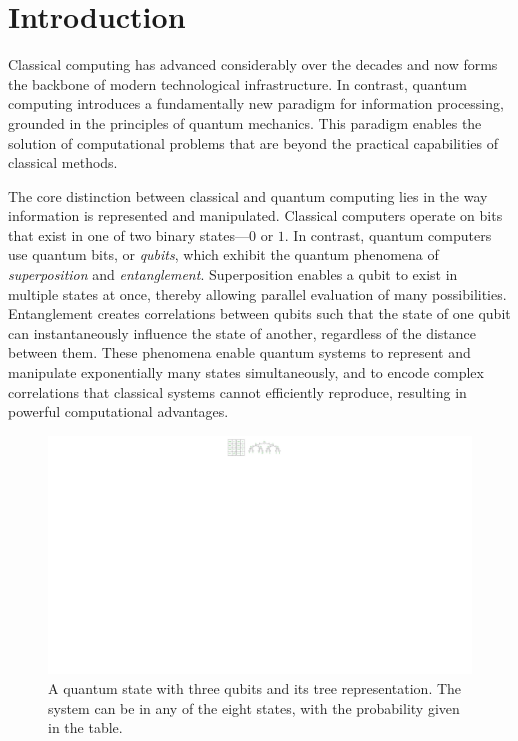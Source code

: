 \section{Introduction}
\label{introduction:section}

Classical computing has advanced considerably over the decades and now forms the backbone of modern technological infrastructure. %
In contrast, quantum computing introduces a fundamentally new paradigm for information processing, grounded in the principles of quantum mechanics. This paradigm enables the solution of computational problems that are beyond the practical capabilities of classical methods. %

The core distinction between classical and quantum computing lies in the way information is represented and manipulated. %
Classical computers operate on bits that exist in one of two binary states—$0$ or $1$. In contrast, quantum computers use quantum bits, or \emph{qubits}, which exhibit the quantum phenomena of \emph{superposition} and \emph{entanglement}. %
Superposition enables a qubit to exist in multiple states at once, thereby allowing parallel evaluation of many possibilities. Entanglement creates correlations between qubits such that the state of one qubit can instantaneously influence the state of another, regardless of the distance between them. %
These phenomena enable quantum systems to represent and manipulate exponentially many states simultaneously,
and to encode complex correlations that classical systems cannot efficiently reproduce, resulting in powerful computational advantages. %

\begin{figure}
\center
\includegraphics[scale=0.95]{Figures/Trees/Tree}
\caption{A quantum state with three qubits and its tree representation.
The system can be in any of the eight states, with the probability given in the table.}
\label{qustate:tree:fig}
\end{figure}

